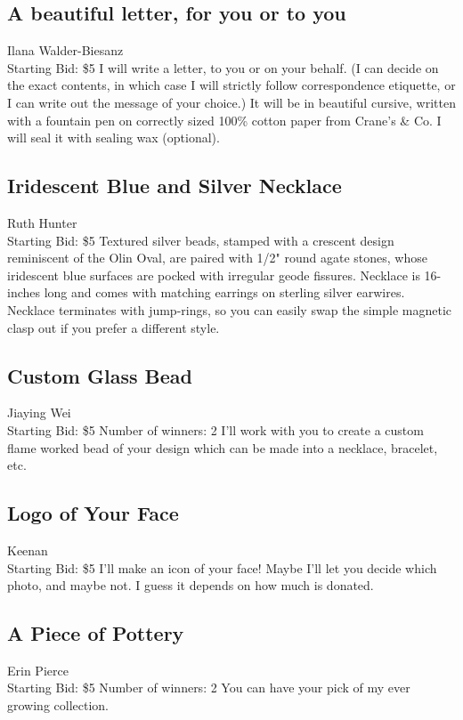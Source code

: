 \documentclass[11pt]{article}
\begin{document}
\subsection{A beautiful letter, for you or to you}
Ilana Walder-Biesanz
\\
Starting Bid: \$5
\newline
I will write a letter, to you or on your behalf. (I can decide on the exact contents, in which case I will strictly follow correspondence etiquette, or I can write out the message of your choice.) It will be in beautiful cursive, written with a fountain pen on correctly sized 100\% cotton paper from Crane's \& Co. I will seal it with sealing wax (optional).
\subsection{Iridescent Blue and Silver Necklace}
Ruth Hunter
\\
Starting Bid: \$5
\newline
Textured silver beads, stamped with a crescent design reminiscent of the Olin Oval, are paired with 1/2" round agate stones, whose iridescent blue surfaces are pocked with irregular geode fissures. Necklace is 16-inches long and comes with matching earrings on sterling silver earwires.  Necklace terminates with jump-rings, so you can easily swap the simple magnetic clasp out if you prefer a different style.
\subsection{Custom Glass Bead}
Jiaying Wei
\\
Starting Bid: \$5
\newline
Number of winners: 2
\newline
I'll work with you to create a custom flame worked bead of your design which can be made into a necklace, bracelet, etc.
\subsection{Logo of Your Face}
Keenan
\\
Starting Bid: \$5
\newline
I'll make an icon of your face! Maybe I'll let you decide which photo, and maybe not. I guess it depends on how much is donated.
\subsection{A Piece of Pottery}
Erin Pierce
\\
Starting Bid: \$5
\newline
Number of winners: 2
\newline
You can have your pick of my ever growing collection.
\end{document}
